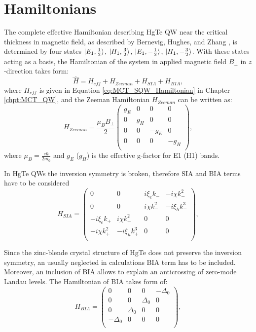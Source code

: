 \documentclass[titlepage,a4paper]{book}
\newcommand{\wciecie}{\quad\phantom{v}}
\begin{document}
\section{Hamiltonians}
\label{chpt:MCT_QW_Hamiltonians}
\wciecie
The complete effective Hamiltonian describing HgTe QW near the critical thickness in magnetic field, as described by Bernevig, Hughes, and Zhang \cite{Bernevig_Topology2}, is determined by four states $\ket{E_1,\frac{1}{2}}$, $\ket{H_1,\frac{3}{2}}$, $\ket{E_1,-\frac{1}{2}}$, $\ket{H_1,-\frac{3}{2}}$. With these states acting as a basis, the Hamiltonian of the system in applied magnetic field $B_{\perp}$ in $z$-direction takes form:
\begin{equation}
\label{eq:MCT_SQW_MagneticField_SM}
\hat H = H_{eff} + H_{Zeeman} + H_{SIA} + H_{BIA} ,
\end{equation}
where $H_{eff}$ is given in Equation \ref{eq:MCT_SQW_Hamiltonian} in Chapter \ref{chpt:MCT_QW}, and the Zeeman Hamiltonian $H_{Zeeman}$ can be written as:
\begin{equation}
\label{eq:MCT_SQW_H_Zeeman}
H_{Zeeman} = \frac{\mu_B B_{\perp}}{2} 
\begin{pmatrix}
g_E & 0&0 &0 \\
0& g_H &0 &0 \\
0& 0& -g_E &0 \\
0& 0& 0& -g_H \\
\end{pmatrix} ,
\end{equation}
where $\mu_B = \frac{e\hbar}{2m_0}$ and $g_E$ ($g_H$) is the effective g-factor for E1 (H1) bands.

In HgTe QWs the inversion symmetry is broken, therefore SIA and BIA terms have to be considered
\begin{equation}
\label{eq:MCT_SQW_H_SIA}
H_{SIA} = 
\begin{pmatrix}
0 & 0 & i\xi_e k_{-}  & -i\chi k^2_{-} \\
0 & 0 & i\chi k^2_{-} &  -i\xi_h k^3_{-} \\
-i\xi_e k_{+}  & i\chi k^2_{+} & 0 & 0\\
-i\chi k^2_{+} & -i\xi_h k^3_{+} & 0 & 0 \\
\end{pmatrix} ,
\end{equation}

Since the zinc-blende crystal structure of HgTe does not preserve the inversion symmetry, an usually neglected in calculations BIA term has to be included. Moreover, an inclusion of BIA allows to explain an anticrossing of zero-mode Landau levels. The Hamiltonian of BIA takes form of: 
\begin{equation}
\label{eq:MCT_SQW_H_BIA}
H_{BIA} = 
\begin{pmatrix}
0 & 0 & 0 & -\Delta_0 \\
0 & 0 & \Delta_0 & 0 \\
0 & \Delta_0 & 0 & 0\\
-\Delta_0 & 0 & 0 & 0 \\
\end{pmatrix} ,
\end{equation}
\end{document}
